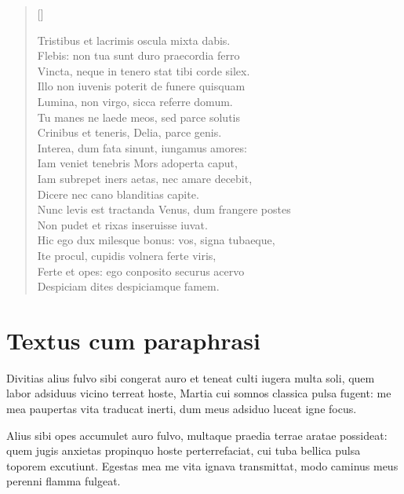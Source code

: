 \begin{verse}[\versewidth]
\begin{altverse}
{Tristibus et lacrimis oscula mixta dabis.\\
Flebis: non tua sunt duro praecordia ferro\\
Vincta, neque in tenero stat tibi corde silex.\\
Illo non iuvenis poterit de funere quisquam\\
Lumina, non virgo, sicca referre domum.\\
Tu manes ne laede meos, sed parce solutis\\
Crinibus et teneris, Delia, parce genis.\\
Interea, dum fata sinunt, iungamus amores:\\
Iam veniet tenebris Mors adoperta caput,\\
Iam subrepet iners aetas, nec amare decebit,\\
Dicere nec cano blanditias capite.\\
Nunc levis est tractanda Venus, dum frangere postes\\
Non pudet et rixas inseruisse iuvat.\\
Hic ego dux milesque bonus: vos, signa tubaeque,\\
Ite procul, cupidis volnera ferte viris,\\
Ferte et opes: ego conposito securus acervo\\
Despiciam dites despiciamque famem. \\

}
\end{altverse}
\end{verse}

\newpage

\section*{Textus cum paraphrasi}

{\large

Divitias alius fulvo sibi congerat auro et teneat culti iugera multa soli, quem labor adsiduus vicino terreat hoste, Martia cui somnos classica pulsa fugent: me mea paupertas vita traducat inerti, dum meus adsiduo luceat igne focus.\\

}

\noindent Alius sibi opes accumulet auro fulvo, multaque praedia terrae aratae possideat: quem jugis anxietas propinquo hoste perterrefaciat, cui tuba bellica pulsa toporem excutiunt. Egestas mea me vita ignava transmittat, modo caminus meus perenni flamma fulgeat.\\


